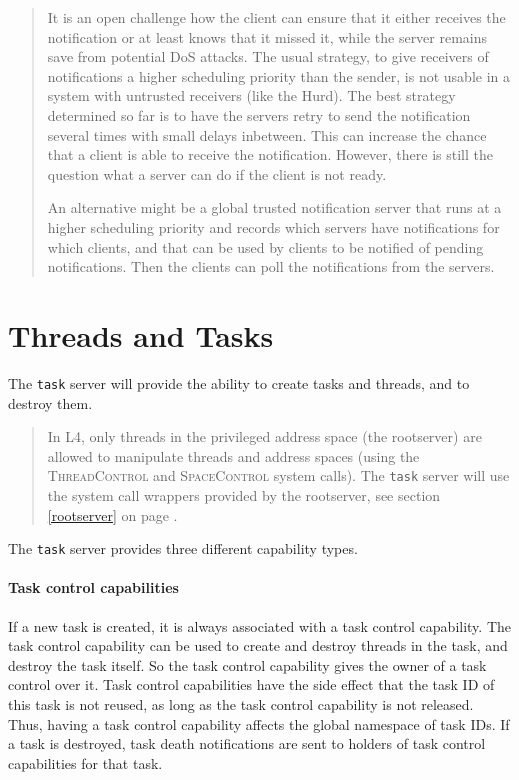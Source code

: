 \documentclass[9pt,a4paper]{extarticle}
\newenvironment{comment}{\footnotesize \begin{quote}}{\end{quote}}
\begin{document}
\begin{comment}
  It is an open challenge how the client can ensure that it either
  receives the notification or at least knows that it missed it, while
  the server remains save from potential DoS attacks.  The usual
  strategy, to give receivers of notifications a higher scheduling
  priority than the sender, is not usable in a system with untrusted
  receivers (like the Hurd).  The best strategy determined so far is
  to have the servers retry to send the notification several times
  with small delays inbetween.  This can increase the chance that a
  client is able to receive the notification.  However, there is still
  the question what a server can do if the client is not ready.
 
  An alternative might be a global trusted notification server that
  runs at a higher scheduling priority and records which servers have
  notifications for which clients, and that can be used by clients to
  be notified of pending notifications.  Then the clients can poll the
  notifications from the servers.
\end{comment}


\section{Threads and Tasks}

The \texttt{task} server will provide the ability to create tasks and
threads, and to destroy them.

\begin{comment}
  In L4, only threads in the privileged address space (the rootserver)
  are allowed to manipulate threads and address spaces (using the
  \textsc{ThreadControl} and \textsc{SpaceControl} system calls).  The
  \texttt{task} server will use the system call wrappers provided by
  the rootserver, see section \ref{rootserver} on page
  \pageref{rootserver}.
\end{comment}

The \texttt{task} server provides three different capability types.

\paragraph{Task control capabilities}
If a new task is created, it is always associated with a task control
capability.  The task control capability can be used to create and
destroy threads in the task, and destroy the task itself.  So the task
control capability gives the owner of a task control over it.  Task
control capabilities have the side effect that the task ID of this
task is not reused, as long as the task control capability is not
released.  Thus, having a task control capability affects the global
namespace of task IDs.  If a task is destroyed, task death
notifications are sent to holders of task control capabilities for
that task.
\end{document}

